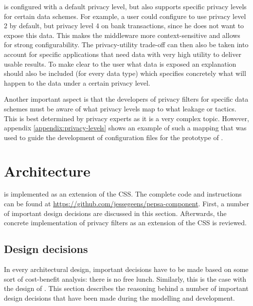 \middleware{} is configured with a default privacy level, but also supports specific privacy levels for certain data schemes. For example, a user could configure \middleware{} to use privacy level 2 by default, but privacy level 4 on bank transactions, since he does not want to expose this data. This makes the middleware more context-sensitive and allows for strong configurability. The privacy-utility trade-off can then also be taken into account for specific applications that need data with very high utility to deliver usable results. To make clear to the user what data is exposed an explanation should also be included (for every data type) which specifies concretely what will happen to the data under a certain privacy level.

Another important aspect is that the developers of privacy filters for specific data schemes must be aware of what privacy levels map to what leakage or tactics. This is best determined by privacy experts as it is a very complex topic. However, appendix \ref{appendix:privacy-levels} shows an example of such a mapping that was used to guide the development of configuration files for the prototype of \middleware{}.

\section{Architecture}
\label{sec:implementation}
\middleware{} is implemented as an extension of the \acrlong{CSS}. The complete code and instructions can be found at \url{https://github.com/jessegeens/pepsa-component}. First, a number of important design decisions are discussed in this section. Afterwards, the concrete implementation of privacy filters as an extension of the \gls{CSS} is reviewed.

\subsection{Design decisions}
\label{sec:design-decisions}
In every architectural design, important decisions have to be made based on some sort of cost-benefit analysis: there is no free lunch. Similarly, this is the case with the design of \middleware{}. This section describes the reasoning behind a number of important design decisions that have been made during the modelling and development.

